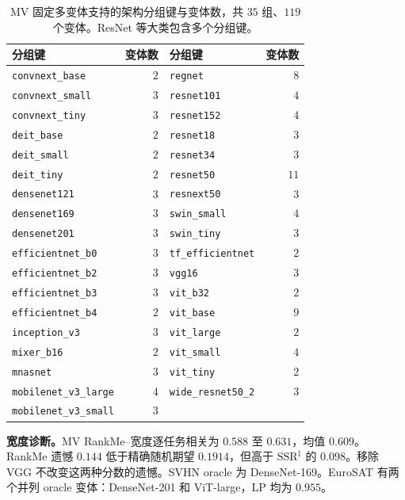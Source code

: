 \documentclass{article}
\newcommand{\SSRdag}{\ensuremath{\mathrm{SSR}^{\ddagger}}\xspace}
\begin{document}
\begin{table}[h]
\centering\small
\caption{MV 固定多变体支持的架构分组键与变体数，共 $35$ 组、$119$ 个变体。ResNet 等大类包含多个分组键。}
\label{tab:mv_families_zh}
\begin{tabular}{lrlr}
\toprule
分组键 & 变体数 & 分组键 & 变体数 \\
\midrule
\texttt{convnext\_base} & $2$ & \texttt{regnet} & $8$ \\
\texttt{convnext\_small} & $3$ & \texttt{resnet101} & $4$ \\
\texttt{convnext\_tiny} & $3$ & \texttt{resnet152} & $4$ \\
\texttt{deit\_base} & $2$ & \texttt{resnet18} & $3$ \\
\texttt{deit\_small} & $2$ & \texttt{resnet34} & $3$ \\
\texttt{deit\_tiny} & $2$ & \texttt{resnet50} & $11$ \\
\texttt{densenet121} & $3$ & \texttt{resnext50} & $3$ \\
\texttt{densenet169} & $3$ & \texttt{swin\_small} & $4$ \\
\texttt{densenet201} & $3$ & \texttt{swin\_tiny} & $3$ \\
\texttt{efficientnet\_b0} & $3$ & \texttt{tf\_efficientnet} & $2$ \\
\texttt{efficientnet\_b2} & $3$ & \texttt{vgg16} & $3$ \\
\texttt{efficientnet\_b3} & $3$ & \texttt{vit\_b32} & $2$ \\
\texttt{efficientnet\_b4} & $2$ & \texttt{vit\_base} & $9$ \\
\texttt{inception\_v3} & $3$ & \texttt{vit\_large} & $2$ \\
\texttt{mixer\_b16} & $2$ & \texttt{vit\_small} & $4$ \\
\texttt{mnasnet} & $3$ & \texttt{vit\_tiny} & $2$ \\
\texttt{mobilenet\_v3\_large} & $4$ & \texttt{wide\_resnet50\_2} & $3$ \\
\texttt{mobilenet\_v3\_small} & $3$ &  &  \\
\bottomrule
\end{tabular}
\end{table}

\textbf{宽度诊断。}MV RankMe--宽度逐任务相关为 $0.588$ 至 $0.631$，均值 $0.609$。RankMe 遗憾 $0.144$ 低于精确随机期望 $0.1914$，但高于 \SSRdag 的 $0.098$。移除 VGG 不改变这两种分数的遗憾。SVHN oracle 为 DenseNet-169。EuroSAT 有两个并列 oracle 变体：DenseNet-201 和 ViT-large，LP 均为 $0.955$。
\end{document}

